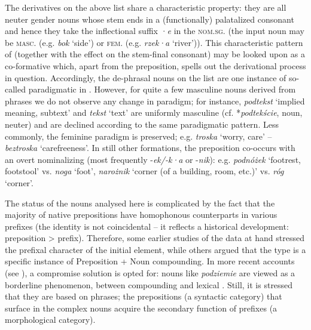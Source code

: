 \documentclass[output=paper]{LSP/langsci}
\begin{document}
{The derivatives on the above list share a characteristic  property: they are all neuter gender nouns whose stem ends in a (functionally) palatalized consonant and hence they take the inflectional suffix} ·{\textit{e}} {in the \textsc{nom.sg.} (the input noun may be \textsc{masc.} (e.g.} {\textit{bok}} {‘side’) or \textsc{fem.} (e.g.} {\textit{rzek}}{\textit·}{\textit{a}} {‘river’)). This characteristic pattern of  (together with the  effect on the stem-final consonant) may be looked upon as a co-formative which, apart from the preposition, spells out the derivational process in question. Accordingly, the de-phrasal nouns on the list are one instance of so-called paradigmatic  in . However, for quite a few masculine nouns derived from} { phrases we do not observe any change in paradigm; for instance,} {\textit{podtekst}} {‘implied meaning, subtext’ and} {\textit{tekst}} {‘text’ are uniformly masculine (cf. *}{\textit{podtekście}}{, noun, neuter) and are declined according to the same paradigmatic pattern. Less commonly, the feminine paradigm is preserved; e.g.} {\textit{troska}} {‘worry, care’ –} {\textit{beztroska}} {‘carefreeness’. In still other formations, the preposition co-occurs with an overt nominalizing  (most frequently -}{\textit{ek/-k}}{\textit·}{\textit{a}} {or -}{\textit{nik}}{): e.g.} {\textit{podnóżek}} {‘footrest, footstool’ vs.} {\textit{noga}} {‘foot’,} {\textit{narożnik}} {‘corner (of a building, room, etc.)’ vs.} {\textit{róg}} {‘corner’.}

{The status of the nouns analysed here is complicated by the fact that the majority of native  prepositions have homophonous counterparts in various prefixes (the identity is not coincidental – it reflects a historical development: preposition > prefix). Therefore, some earlier studies of the data at hand stressed the prefixal character of the initial element, while others argued that the type is a specific instance of Preposition + Noun compounding. In more recent accounts (see \citealt[10]{Symoni-Sułkowska1987}), a compromise solution is opted for: nouns like} {\textit{podziemie}} {are viewed as a borderline phenomenon, between compounding and lexical . Still, it is stressed that they are based on  phrases; the prepositions (a syntactic category) that surface in the complex nouns acquire the secondary function of prefixes (a morphological category).}
\end{document}
